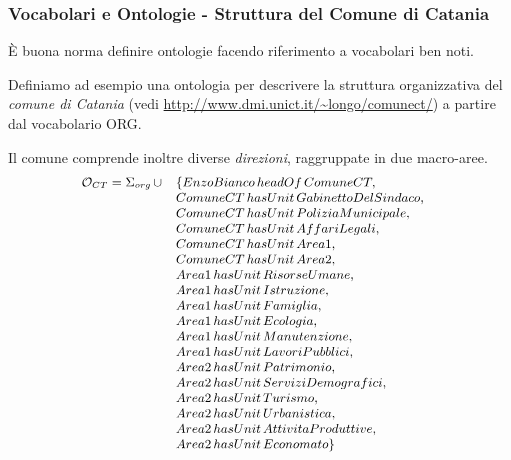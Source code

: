\documentclass[8pt]{beamer}
\begin{document}
\begin{frame}
\frametitle{Vocabolari e Ontologie - Struttura del Comune di Catania}
\`E buona norma definire ontologie facendo riferimento a vocabolari
ben noti.
\vspace{\baselineskip}

Definiamo ad esempio una ontologia per descrivere la struttura
organizzativa del \emph{comune di Catania} (vedi \url{http://www.dmi.unict.it/~longo/comunect/})
a partire dal vocabolario ORG.
\vspace{\baselineskip}

Il comune comprende inoltre diverse \emph{direzioni}, raggruppate in due macro-aree. 
\[
\begin{small}
\begin{array}{rll}
\Ont_{CT} = \Sigma_{org}\,\cup & \{ EnzoBianco\,headOf\,ComuneCT, & \\
& ComuneCT\,hasUnit\,GabinettoDelSindaco, & \\
& ComuneCT\,hasUnit\,PoliziaMunicipale, & \\
& ComuneCT\,hasUnit\,AffariLegali, & \\
& ComuneCT\,hasUnit\,Area1, & \\
& ComuneCT\,hasUnit\,Area2, & \\
& Area1\,hasUnit\,RisorseUmane,\\
& Area1\,hasUnit\,Istruzione,\\
& Area1\,hasUnit\,Famiglia, \\
& Area1\,hasUnit\,Ecologia,\\
&Area1\,hasUnit\,Manutenzione,\\
&Area1\,hasUnit\,LavoriPubblici,\\
&Area2\,hasUnit\,Patrimonio,\\
&Area2\,hasUnit\,ServiziDemografici,\\
&Area2\,hasUnit\,Turismo,\\
&Area2\,hasUnit\,Urbanistica,\\
&Area2\,hasUnit\,AttivitaProduttive,\\
&Area2\,hasUnit\,Economato \}
\end{array} 
\end{small}
\]
\end{frame}
\end{document}
